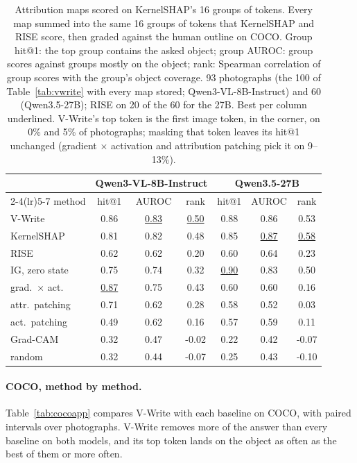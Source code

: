 \begin{table}[!htbp]
  \centering
\footnotesize \setlength{\tabcolsep}{4pt}
\caption{Attribution maps scored on KernelSHAP's 16 groups of tokens. Every map summed into the same 16 groups of tokens that KernelSHAP and RISE score, then graded against the human outline on COCO. Group hit@1: the top group contains the asked object; group AUROC: group scores against groups mostly on the object; rank: Spearman correlation of group scores with the group's object coverage. 93 photographs (the 100 of Table~\ref{tab:vwrite} with every map stored; Qwen3-VL-8B-Instruct) and 60 (Qwen3.5-27B); RISE on 20 of the 60 for the 27B. Best per column underlined. V-Write's top token is the first image token, in the corner, on 0\% and 5\% of photographs; masking that token leaves its hit@1 unchanged (gradient $\times$ activation and attribution patching pick it on 9--13\%).}
  \label{tab:group}
\begin{tabular}{lcccccc}
\toprule
 & \multicolumn{3}{c}{Qwen3-VL-8B-Instruct} & \multicolumn{3}{c}{Qwen3.5-27B} \\
\cmidrule(lr){2-4}\cmidrule(lr){5-7}
method & hit@1 & AUROC & rank & hit@1 & AUROC & rank \\
\midrule
V-Write & 0.86 & \underline{0.83} & \underline{0.50} & 0.88 & 0.86 & 0.53 \\
\midrule
KernelSHAP & 0.81 & 0.82 & 0.48 & 0.85 & \underline{0.87} & \underline{0.58} \\
RISE & 0.62 & 0.62 & 0.20 & 0.60 & 0.64 & 0.23 \\
IG, zero state & 0.75 & 0.74 & 0.32 & \underline{0.90} & 0.83 & 0.50 \\
grad.\ $\times$ act. & \underline{0.87} & 0.75 & 0.43 & 0.60 & 0.60 & 0.16 \\
attr.\ patching & 0.71 & 0.62 & 0.28 & 0.58 & 0.52 & 0.03 \\
act.\ patching & 0.49 & 0.62 & 0.16 & 0.57 & 0.59 & 0.11 \\
Grad-CAM & 0.32 & 0.47 & -0.02 & 0.22 & 0.42 & -0.07 \\
random & 0.32 & 0.44 & -0.07 & 0.25 & 0.43 & -0.10 \\
\bottomrule
\end{tabular}
\end{table}

\paragraph{COCO, method by method.} Table~\ref{tab:cocoapp} compares V-Write with each baseline on COCO, with paired intervals over photographs. V-Write removes more of the answer than every baseline on both models, and its top token lands on the object as often as the best of them or more often.



